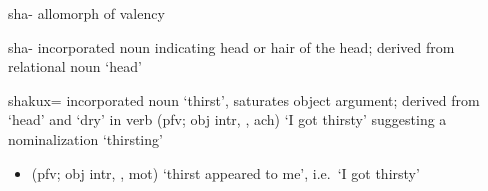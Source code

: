 \begin{morphdesc}[resume*=alphalist]
\item[sha-]\label{m:sha-val}
	allomorph of valency 

\item[sha-]
	incorporated noun indicating head or hair of the head;
	derived from relational noun  ‘head’

\item[shakux=]
	incorporated noun ‘thirst’,
	saturates object argument;
	derived from  ‘head’ and  ‘dry’
		in verb  (pfv; obj intr, , ach) ‘I got thirsty’
		suggesting a nominalization  ‘thirsting’
	\begin{itemize}
	\item	{} (pfv; obj intr, , mot) ‘thirst appeared to me’,
		i.e.\ ‘I got thirsty’
		\parencite[01/11]{leer:1973}
	\end{itemize}


\end{morphdesc}
